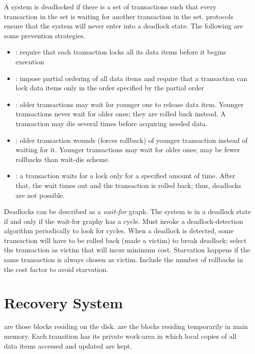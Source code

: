 \documentclass{article}
\begin{document}
A system is deadlocked if there is a set of transactions such that every transaction in the set is waiting for another transaction in the set.  protocols ensure that the system will never enter into a deadlock state. The following are some prevention strategies.
\begin{itemize}
  \item {}: require that each transaction locks all its data items before it begins execution 
  \item {}: impose partial ordering of all data items and require that a transaction can lock data items only in the order specified by the partial order
  \item {}: older transactions may wait for younger one to release data item. Younger transactions never wait for older ones; they are rolled back instead. A transaction may die several times before acquiring needed data. 
  \item {}: older transaction wounds (forces rollback) of younger transaction instead of waiting for it. Younger transactions may wait for older ones; may be fewer rollbacks than wait-die scheme.
  \item {}: a transaction waits for a lock only for a specified amount of time. After that, the wait times out and the transaction is rolled back; thus, deadlocks are not possible. 
\end{itemize}

Deadlocks can be described as a \emph{wait-for} graph. The system is in a deadlock state if and only if the wait-for graphy has a cycle. Must invoke a deadlock-detection algorithm periodically to look for cycles. When a deadlock is detected, some transaction will have to be rolled back (made a victim) to break deadlock; select the transaction as victim that will incur minimum cost. Starvation happens if the same transaction is always chosen as victim. Include the number of rollbacks in the cost factor to avoid starvation. 

\section{Recovery System}

 are those blocks residing on the disk.  are the blocks residing temporarily in main memory. Each transition has its private work-area in which local copies of all data items accessed and updated are kept. \\ 
\end{document}
